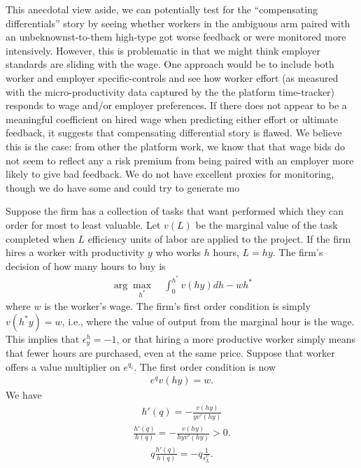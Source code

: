 This anecdotal view aside, we can potentially test for the ``compensating differentials'' story by seeing whether workers in the ambiguous arm paired with an unbeknownst-to-them high-type got worse feedback or were monitored more intensively.
However, this is problematic in that we might think employer standards are sliding with the wage.
One approach would be to include both worker and employer specific-controls and see how worker effort (as measured with the micro-productivity data captured by the the platform time-tracker) responds to wage and/or employer preferences.
If there does not appear to be a meaningful coefficient on hired wage when predicting either effort or ultimate feedback, it suggests that compensating differential story is flawed.
We believe this is the case: from other the platform work, we know that that wage bids do not seem to reflect any a risk premium from being paired with an employer more likely to give bad feedback.
We do not have excellent proxies for monitoring, though we do have some and could try to generate mo


Suppose the firm has a collection of tasks that want performed which they can order for most to least valuable.
Let $v(L)$ be the marginal value of the task completed when $L$ efficiency units of labor are applied to the project.
If the firm hires a worker with productivity $y$ who works $h$ hours, $L = hy$.
The firm's decision of how many hours to buy is
\begin{align}
  \arg\max_{h^*} \quad \int_0^{h^*} v(hy) dh - wh^{*}  
\end{align} 
where $w$ is the worker's wage.
The firm's first order condition is simply $v(h^*y) = w$, i.e., where the value of output from the marginal hour is the wage.
This implies that $\epsilon^h_y = -1$, or that hiring a more productive worker simply means that fewer hours are purchased, even at the same price.
Suppose that worker offers a value multiplier on $e^{q_i}$.
The first order condition is now
\begin{align}
  e^{q} v(h y) = w.
\end{align} 
We have
\begin{align}
  h'(q) = - \frac{v(hy)}{y v'(hy)}
\end{align} 
\begin{align}
  \frac{h'(q)}{h(q)} = - \frac{v(hy)}{hy v'(hy)} > 0. 
\end{align}
\begin{align}
  q \frac{h'(q)}{h(q)} = - q \frac{1}{\epsilon^v_L}.
\end{align}



